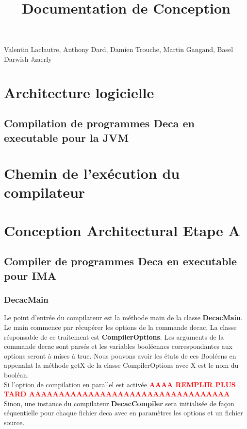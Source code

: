 \documentclass[12pt, a4paper, one side]{article}
\title{Documentation de Conception}
\author{}
\date{}
\begin{document}
    \maketitle

    \begin{center}
        Valentin Laclautre, Anthony Dard, Damien Trouche, Martin Gangand, Basel Darwish Jzaerly
    \end{center}

    \tableofcontents
    \section{Architecture logicielle}
    \subsection{Compilation de programmes Deca en executable pour la JVM}
    \section{Chemin de l'exécution du compilateur}
    \section{Conception Architectural Etape A}

    \subsection{Compiler de programmes Deca en executable pour IMA}

    \subsubsection{DecacMain}
    Le point d'entrée du compilateur est la méthode main de la classe \textbf {DecacMain}. Le main commence par récupérer les options de la commande decac. La classe résponsable de ce traitement est \textbf{CompilerOptions}. Les arguments de la commande decac sont parsés et les variables booléennes correspondantes aux options seront à mises à true. Nous pouvons avoir les états de ces Booléens en appenalnt la méthode getX de la classe CompilerOptions avec X est le nom du booléan.
    \\
    Si l'option de compilation en parallel est activée \textbf {\textcolor{red}{AAAA REMPLIR PLUS TARD AAAAAAAAAAAAAAAAAAAAAAAAAAAAAAAAAA}} \\
    Sinon, une instance du compilateur \textbf{DecacCompiler} sera initialisée de façon séquentielle pour chaque fichier deca avec en paramètres les options et un fichier source.
\end{document}
